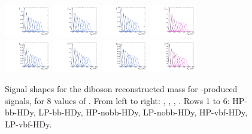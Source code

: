 \begin{figure}[htbp]
  \includegraphics[width=0.18\textwidth]{fig/analysisAppendix/templateSignalVsMX_fromDC_VBFGbuToWW_MVV_mu_HP_vbf_HDy.pdf}
  \includegraphics[width=0.18\textwidth]{fig/analysisAppendix/templateSignalVsMX_fromDC_VBFRadToWW_MVV_mu_HP_vbf_HDy.pdf}
  \includegraphics[width=0.18\textwidth]{fig/analysisAppendix/templateSignalVsMX_fromDC_VBFZprToWW_MVV_mu_HP_vbf_HDy.pdf}
  \includegraphics[width=0.18\textwidth]{fig/analysisAppendix/templateSignalVsMX_fromDC_VBFWprToWZ_MVV_mu_HP_vbf_HDy.pdf}\\
  \includegraphics[width=0.18\textwidth]{fig/analysisAppendix/templateSignalVsMX_fromDC_VBFGbuToWW_MVV_mu_LP_vbf_HDy.pdf}
  \includegraphics[width=0.18\textwidth]{fig/analysisAppendix/templateSignalVsMX_fromDC_VBFRadToWW_MVV_mu_LP_vbf_HDy.pdf}
  \includegraphics[width=0.18\textwidth]{fig/analysisAppendix/templateSignalVsMX_fromDC_VBFZprToWW_MVV_mu_LP_vbf_HDy.pdf}
  \includegraphics[width=0.18\textwidth]{fig/analysisAppendix/templateSignalVsMX_fromDC_VBFWprToWZ_MVV_mu_LP_vbf_HDy.pdf}\\
  \caption{
    Signal shapes for the diboson reconstructed mass \MVV for \VBF-produced signals, for 8 values of \MX.
    From left to right: \GBulktoWW, \RadtoWW, \ZprtoWW, \WprtoWZ.
    Rows 1 to 6: HP-bb-HDy, LP-bb-HDy, HP-nobb-HDy, LP-nobb-HDy, HP-vbf-HDy, LP-vbf-HDy.
  }
  \label{fig:MVVShapes_VBF_HDy}
\end{figure}

